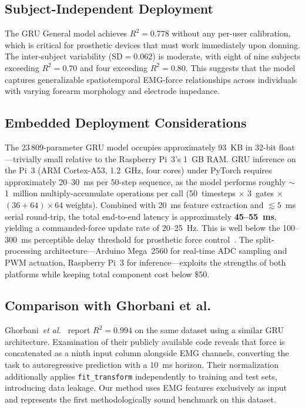 \documentclass[journal]{IEEEtran}
\begin{document}
\subsection{Subject-Independent Deployment}

The GRU General model achieves $R^2 = 0.778$ without any per-user
calibration, which is critical for prosthetic devices that must work
immediately upon donning.  The inter-subject variability
($\text{SD} = 0.062$) is moderate, with eight of nine subjects exceeding
$R^2 = 0.70$ and four exceeding $R^2 = 0.80$.  This suggests that the
model captures generalizable spatiotemporal EMG-force relationships across
individuals with varying forearm morphology and electrode impedance.

\subsection{Embedded Deployment Considerations}

The 23\,809-parameter GRU model occupies approximately 93~KB in 32-bit
float---trivially small relative to the Raspberry Pi~3's 1~GB RAM.
GRU inference on the Pi~3 (ARM Cortex-A53, 1.2~GHz, four cores)
under PyTorch requires approximately 20--30~ms per 50-step sequence,
as the model performs roughly $\sim$1~million multiply-accumulate
operations per call (50~timesteps $\times$ 3~gates $\times$
$(36 + 64) \times 64$ weights).  Combined with 20~ms feature
extraction and $\lesssim5$~ms serial round-trip, the total
end-to-end latency is approximately \textbf{45--55~ms}, yielding a
commanded-force update rate of 20--25~Hz.  This is well below the
100--300~ms perceptible delay threshold for prosthetic force
control~\cite{scheme2011electromyogram}.  The split-processing
architecture---Arduino Mega~2560 for real-time ADC sampling and PWM
actuation, Raspberry Pi~3 for inference---exploits the strengths of
both platforms while keeping total component cost below \$50.

\subsection{Comparison with Ghorbani et al.}

Ghorbani~\emph{et al.}~\cite{ghorbani2023estimation} report $R^2 = 0.994$
on the same dataset using a similar GRU architecture.  Examination of their
publicly available code reveals that force is concatenated as a ninth input
column alongside EMG channels, converting the task to autoregressive
prediction with a 10~ms horizon.  Their normalization additionally applies
\texttt{fit\_transform} independently to training and test sets,
introducing data leakage.  Our method uses EMG features exclusively as
input and represents the first methodologically sound benchmark on this
dataset.
\end{document}
